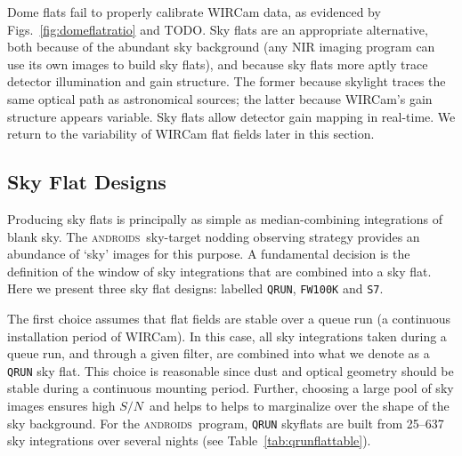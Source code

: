 \documentclass[iop]{emulateapj}
\newcommand{\sn}{\ensuremath{S/N}} %
\newcommand{\androids}{\textsc{androids}}
\newcommand{\todo}[1]{\textcolor{RedOrange}{#1}} %
\newcommand{\Tab}[1]{Table~\ref{tab:#1}}  %
\begin{document}
Dome flats fail to properly calibrate WIRCam data, as evidenced by Figs.~\ref{fig:domeflatratio} and \todo{TODO}.
Sky flats are an appropriate alternative, both because of the abundant sky background (any NIR imaging program can use its own images to build sky flats), and because sky flats more aptly trace detector illumination and gain structure.
The former because skylight traces the same optical path as astronomical sources; the latter because WIRCam's gain structure appears variable.
Sky flats allow detector gain mapping in real-time.
We return to the variability of WIRCam flat fields later in this section.

\subsection{Sky Flat Designs}
\label{sec:flatdesign}

Producing sky flats is principally as simple as median-combining integrations of blank sky. 
The \androids\ sky-target nodding observing strategy provides an abundance of `sky' images for this purpose.
A fundamental decision is the definition of the window of sky integrations that are combined into a sky flat.
Here we present three sky flat designs: labelled \texttt{QRUN}, \texttt{FW100K} and \texttt{S7}.

The first choice assumes that flat fields are stable over a queue run (a continuous installation period of WIRCam).
In this case, all sky integrations taken during a queue run, and through a given filter, are combined into what we denote as a \texttt{QRUN} sky flat.
This choice is reasonable since dust and optical geometry should be stable during a continuous mounting period.
Further, choosing a large pool of sky images ensures high \sn\, and helps to helps to marginalize over the shape of the sky background.
For the \androids\ program, \texttt{QRUN} skyflats are built from 25--637 sky integrations over several nights (see \Tab{qrunflattable}).
\end{document}
